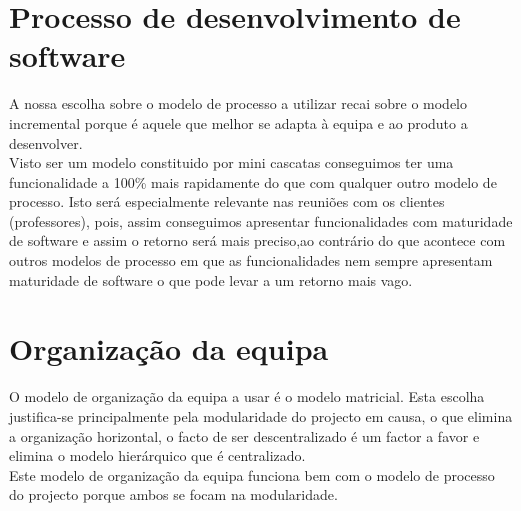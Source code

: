 \documentclass[a4paper]{report}
\begin{document}
\pagebreak

\section{Processo de desenvolvimento de software}
A nossa escolha sobre o modelo de processo a utilizar recai sobre o modelo incremental porque é aquele que melhor se adapta à equipa e ao produto a desenvolver.\\
Visto ser um modelo constituido por mini cascatas conseguimos ter uma funcionalidade a 100\% mais rapidamente do que com qualquer outro modelo de processo. Isto será especialmente relevante nas reuniões com os clientes (professores), pois, assim conseguimos apresentar funcionalidades com maturidade de software e assim o retorno será mais preciso,ao contrário do que acontece com outros modelos de processo em que as funcionalidades nem sempre apresentam maturidade de software o que pode levar a um retorno mais vago.


\section{Organização da equipa}
O modelo de organização da equipa a usar é o modelo matricial. Esta escolha justifica-se principalmente pela modularidade do projecto em causa, o que elimina a organização horizontal, o facto de ser descentralizado é um factor a favor e elimina o modelo hierárquico que é centralizado.\\
Este modelo de organização da equipa funciona bem com o modelo de processo do projecto porque ambos se focam na modularidade.\\
\end{document}
